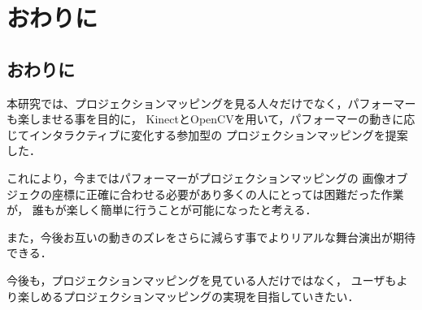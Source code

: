 \chapter{おわりに}
\thispagestyle{fancy}

\section{おわりに}

本研究では、プロジェクションマッピングを見る人々だけでなく，パフォーマーも楽しませる事を目的に，
KinectとOpenCVを用いて，パフォーマーの動きに応じてインタラクティブに変化する参加型の
プロジェクションマッピングを提案した．

これにより，今まではパフォーマーがプロジェクションマッピングの
画像オブジェクの座標に正確に合わせる必要があり多くの人にとっては困難だった作業が，
誰もが楽しく簡単に行うことが可能になったと考える．

また，今後お互いの動きのズレをさらに減らす事でよりリアルな舞台演出が期待できる．

今後も，プロジェクションマッピングを見ている人だけではなく，
ユーザもより楽しめるプロジェクションマッピングの実現を目指していきたい．
